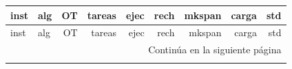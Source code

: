 \noindent\begin{minipage}{\textwidth}
\captionsetup{width=\textwidth}
\label{tab:resultados-completos}
\end{minipage}
\medskip
\begingroup
\setlength{\LTleft}{0pt}
\setlength{\LTright}{0pt}
\setlength{\tabcolsep}{2pt}
\scriptsize
\begin{longtable}{@{}llrrrrrrr@{}}
\toprule
inst & alg & OT & tareas & ejec & rech & mkspan & carga & std \\
\midrule
\endfirsthead

\toprule
inst & alg & OT & tareas & ejec & rech & mkspan & carga & std \\
\midrule
\endhead

\midrule
\multicolumn{9}{r}{Continúa en la siguiente página}\\
\midrule
\endfoot

\bottomrule
\endlastfoot


\end{longtable}
